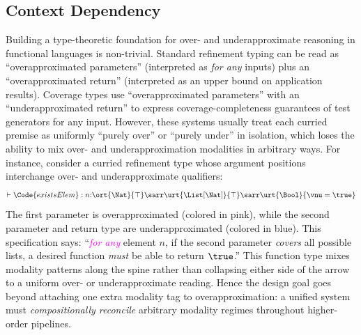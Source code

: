 \subsection{Context Dependency}


Building a type-theoretic foundation for over- and underapproximate reasoning in functional languages is non-trivial.
Standard refinement typing can be read as ``overapproximated parameters'' (interpreted as \emph{for any} inputs) plus an ``overapproximated return'' (interpreted as an upper bound on application results).
Coverage types use ``overapproximated parameters'' with an ``underapproximated return'' to express coverage-completeness guarantees of test generators for any input.
However, these systems usually treat each curried premise as uniformly ``purely over'' or ``purely under'' in isolation, which loses the ability to mix over- and underapproximation modalities in arbitrary ways.
For instance, consider a curried refinement type whose argument positions interchange over- and underapproximate qualifiers:
\begin{align*}
    \vdash \Code{existsElem} : n{:}\ort{\Nat}{\top} \sarr \urt{\List[\Nat]}{\top} \sarr \urt{\Bool}{\vnu = \true} 
\end{align*}\noindent
The first parameter is overapproximated (colored in pink), while the second parameter and return type are underapproximated (colored in blue).
This specification says: ``\textcolor{magenta}{\emph{for any}} element $n$, if the second parameter \textcolor{CobaltBlue}{\emph{covers}} all possible lists, a desired  function \textcolor{CobaltBlue}{\emph{must}} be able to return $\true$.'' 
This function type mixes modality patterns along the spine rather than collapsing either side of the arrow to a uniform over- or underapproximate reading.
Hence the design goal goes beyond attaching one extra modality tag to overapproximation: a unified system must
\emph{compositionally reconcile} arbitrary modality regimes throughout higher-order pipelines.

